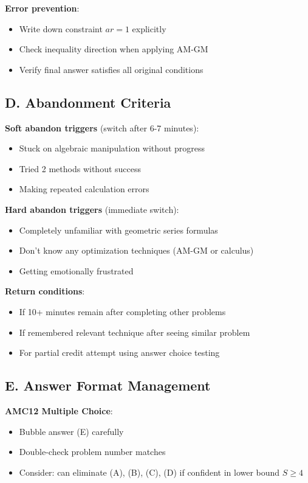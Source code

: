 \documentclass[12pt]{article}
\begin{document}
\begin{competitionbox}
\textbf{Error prevention}:
\begin{itemize}[leftmargin=*]
    \item Write down constraint $ar=1$ explicitly
    \item Check inequality direction when applying AM-GM
    \item Verify final answer satisfies all original conditions
\end{itemize}

\subsection*{D. Abandonment Criteria}

\textbf{Soft abandon triggers} (switch after 6-7 minutes):
\begin{itemize}[leftmargin=*]
    \item Stuck on algebraic manipulation without progress
    \item Tried 2 methods without success
    \item Making repeated calculation errors
\end{itemize}

\textbf{Hard abandon triggers} (immediate switch):
\begin{itemize}[leftmargin=*]
    \item Completely unfamiliar with geometric series formulas
    \item Don't know any optimization techniques (AM-GM or calculus)
    \item Getting emotionally frustrated
\end{itemize}

\textbf{Return conditions}:
\begin{itemize}[leftmargin=*]
    \item If 10+ minutes remain after completing other problems
    \item If remembered relevant technique after seeing similar problem
    \item For partial credit attempt using answer choice testing
\end{itemize}

\subsection*{E. Answer Format Management}

\textbf{AMC12 Multiple Choice}:
\begin{itemize}[leftmargin=*]
    \item Bubble answer (E) carefully
    \item Double-check problem number matches
    \item Consider: can eliminate (A), (B), (C), (D) if confident in lower bound $S \geq 4$
\end{itemize}


\end{competitionbox}
\end{document}
